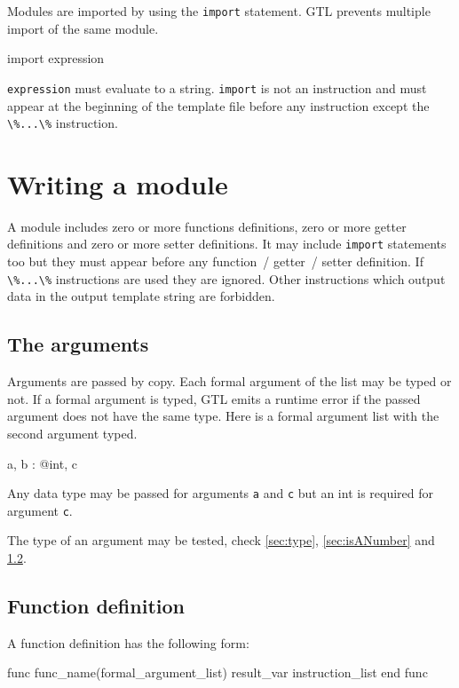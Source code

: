 \documentclass[10pt,openright,twosides,final]{memoir}
\newcommand{\gtltype}[1]{{\small\ttfamily #1}}
\newcommand{\gtlinline}[1]{\colorbox{light-blue}{\lstinline[language=gtl]{#1}}}
\begin{document}
Modules are imported by using the \gtlinline{import} statement. GTL prevents multiple import of the same module.

\begin{gtl}
import expression
\end{gtl}

\gtlinline{expression} must evaluate to a \gtltype{string}. \gtlinline{import} is not an instruction and must appear at the beginning of the template file before any instruction except the \gtlinline{\%...\%} instruction.

\section{Writing a module}

A module includes zero or more functions definitions, zero or more getter definitions and zero or more setter definitions. It may include \gtlinline{import} statements too but they must appear before any function~/ getter~/ setter definition. If  \gtlinline{\%...\%} instructions are used they are ignored. Other instructions which output data in the output template string are forbidden.

\subsection{The arguments}

Arguments are passed by copy. Each formal argument of the list may be typed or not. If a formal argument is typed, GTL emits a runtime error if the passed argument does not have the same type. Here is a formal argument list with the second argument typed.

\begin{gtl}
a, b : @int, c
\end{gtl}

Any data type may be passed for arguments \gtlinline{a} and \gtlinline{c} but an \gtltype{int} is required for argument \gtlinline{c}.

The type of an argument may be tested, check \ref{sec:type}, \ref{sec:isANumber} and \ref{sec:function}.

\subsection{Function definition}
\label{sec:function}

A function definition has the following form:

\begin{gtl}
func func_name(formal_argument_list) result_var
  instruction_list
end func
\end{gtl}
\end{document}
